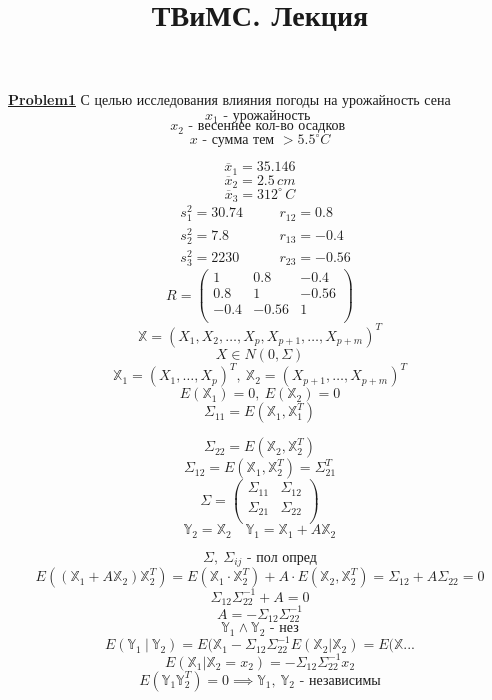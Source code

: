 \documentclass[a4paper]{article}
\begin{document}
\title{ТВиМС. Лекция}
\maketitle

\textbf{\underline{Problem1}}
С целью исследования влияния погоды на урожайность сена
\[
    x_1 \text{ - урожайность }
\]
\[
    x_2 \text{ - весеннее кол-во осадков }
\]
\[
    x \text{ - сумма тем } > 5.5^{\circ} C
\]

\[
    \overline{x}_1 = 35.146
\]
\[
    \overline{x}_2 = 2.5\, cm
\]
\[
    \overline{x}_3 = 312^{\circ}\, C
\]
\[
    \begin{aligned}
        &s_1^{2} = 30.74 &\quad &r_{12} = 0.8\\
        &s_2^2 = 7.8 &\quad &r_{13} = -0.4\\
        &s_3^2 = 2230 &\quad &r_{23} = -0.56
    \end{aligned}
\]
\[
    R = \begin{pmatrix}
    1 & 0.8 & -0.4\\
    0.8 & 1 & -0.56\\
    -0.4 & -0.56 & 1\\
    
    \end{pmatrix}
\]
\[
    \mathbb{X} = (X_1, X_2, \dots , X_p, X_{p+1}, \dots , X_{p+m})^{T}
\]
\[
    X \in N(0, \Sigma)
\]
\[
    \mathbb{X}_1 = (X_1, \dots, X_p)^{T}, \ \mathbb{X}_2 = (X_{p+1}, \dots, X_{p+m})^{T}
\]
\[
    E(\mathbb{X}_1) = 0, \ E(\mathbb{X}_2) = 0
\]
\[
    \Sigma_{11} = E(\mathbb{X}_1, \mathbb{X}_1^{T}) 
\]

\[
    \Sigma_{22} = E(\mathbb{X}_2, \mathbb{X}_2^{T}) 
\]
\[
    \Sigma_{12} = E(\mathbb{X}_1, \mathbb{X}_2^{T}) = \Sigma_{21}^{T}
\]
\[
    \Sigma = 
    \begin{pmatrix}
    \Sigma_{11} & \Sigma_{12}\\
    \Sigma_{21} & \Sigma_{22}\\
    
    \end{pmatrix}
\]
\[
    \mathbb{Y}_2 = \mathbb{X}_2 \quad \mathbb{Y}_1 = \mathbb{X}_1 + A \mathbb{X}_2
\]

\[
    \Sigma, \ \Sigma_{ij} \text{ - пол опред}
\]
\[
    E((\mathbb{X}_1 + A \mathbb{X}_2) \mathbb{X}_2^{T}) = 
    E(\mathbb{X}_1 \cdot \mathbb{X}_2^{T}) + A \cdot E(\mathbb{X}_2,\mathbb{X}_2^{T})
    = \Sigma_{12} + A \Sigma_{22} = 0
\]
\[
    \Sigma_{12} \Sigma_{22}^{-1} + A = 0
\]
\[
    A = -\Sigma_{12} \Sigma_{22}^{-1}
\]
\[
    \mathbb{Y}_1 \land \mathbb{Y}_2 \text{ - нез}
\]
\[
    E(\mathbb{Y}_1 \ | \ \mathbb{Y}_2) = E(\mathbb{X}_1 - \Sigma_{12}\Sigma_{22}^{-1}
    E(\mathbb{X}_2 | \mathbb{X}_2) = E(\mathbb{X} ... 
\]
\[
    E(\mathbb{X}_1 | \mathbb{X}_2 = x_2) = -\Sigma_{12} \Sigma_{22}^{-1} x_2
\]
\[
    E(\mathbb{Y}_1 \mathbb{Y}_2^{T}) = 0 \implies \mathbb{Y}_1, \ \mathbb{Y}_2 
    \text{ - независимы}
\]
\end{document}
